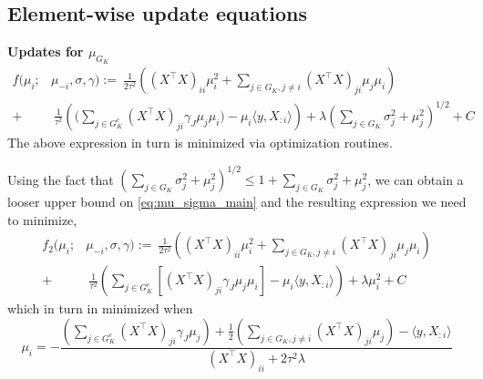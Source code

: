 




\subsection{Element-wise update equations}

\textbf{Updates for $\mu_{G_K}$}
\begin{equation} \label{eq:mu_update}
\begin{aligned}
    f(\mu_i; & \mu_{-i}, \sigma, \gamma) :=\
    \frac{1}{2\tau^2} \left(
	(X^\top X)_{ii} \mu_i^2 + 
	\sum_{j \in G_K, j\neq i} (X^\top X)_{ji} \mu_j \mu_i
    \right) \\
+ &\
    \frac{1}{\tau^2} \left(
	\bigg( \sum_{j \in G_K^c} (X^\top X)_{ji} \gamma_{J} \mu_j \mu_i \bigg) -
	\mu_i \langle y, X_{:i} \rangle   
    \right)
+
    \lambda \left( \sum_{j \in G_K} 
	\sigma_j^2 + \mu_j^2
    \right)^{1/2} + C
\end{aligned}
\end{equation}
The above expression in turn is minimized via optimization routines.

Using the fact that $ \left( \sum_{j \in G_K} \sigma_j^2 + \mu_j^2 \right)^{1/2} \leq 1 + \sum_{j \in G_K} \sigma_j^2 + \mu_j^2 $, we can obtain a looser upper bound on \eqref{eq:mu_sigma_main} and the resulting expression we need to minimize,
\begin{equation}
\begin{aligned}
    f_2(\mu_i; & \mu_{-i}, \sigma, \gamma) :=\
    \frac{1}{2\tau^2} \left(
	(X^\top X)_{ii} \mu_i^2 + 
	\sum_{j \in G_K, j\neq i} (X^\top X)_{ji} \mu_j \mu_i
    \right) \\
+ &\
    \frac{1}{\tau^2} \left(
	\sum_{j \in G_K^c} \left[ (X^\top X)_{ji} \gamma_{J} \mu_j \mu_i \right] -
	\mu_i \langle y, X_{:i} \rangle   
    \right)
+
    \lambda \mu_i^2 + C
\end{aligned}
\end{equation}
which in turn in minimized when
\begin{equation} \label{eq:mu_analytic}
    \mu_i =
    - \frac{
	\left(\sum_{j \in G_K^c} (X^\top X)_{ji} \gamma_{J} \mu_j \right) +
	\frac{1}{2} \left(\sum_{j \in G_K, j\neq i} (X^\top X)_{ji} \mu_j \right)-
	\langle y, X_{:i} \rangle 
    }{
	(X^\top X)_{ii} +
	2 \tau^2 \lambda 
    }
\end{equation}

